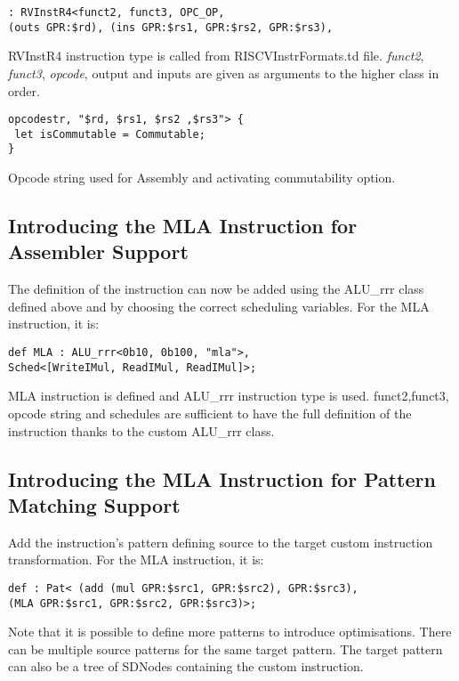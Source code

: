 \begin{lstlisting}
: RVInstR4<funct2, funct3, OPC_OP,
(outs GPR:$rd), (ins GPR:$rs1, GPR:$rs2, GPR:$rs3),
\end{lstlisting}

RVInstR4 instruction type is called from RISCVInstrFormats.td file. \textit{funct2}, \textit{funct3}, \textit{opcode}, output and inputs are given as arguments to the higher class in order.

\begin{lstlisting}
opcodestr, "$rd, $rs1, $rs2 ,$rs3"> {
 let isCommutable = Commutable;
}
\end{lstlisting}

Opcode string used for Assembly and activating commutability option.

\subsection{Introducing the MLA Instruction for Assembler Support}

The definition of the instruction can now be added using the ALU\_rrr class defined above and by choosing the correct scheduling variables. For the MLA instruction, it is:

\begin{lstlisting}
def MLA : ALU_rrr<0b10, 0b100, "mla">,
Sched<[WriteIMul, ReadIMul, ReadIMul]>;
\end{lstlisting}

MLA instruction is defined and ALU\_rrr instruction type is used. funct2,funct3, opcode string and schedules are sufficient to have the full definition of the instruction thanks to the custom ALU\_rrr class.

\subsection{Introducing the MLA Instruction for Pattern Matching Support}
Add the instruction’s pattern defining source to the target custom instruction transformation. For the MLA instruction, it is:

\begin{lstlisting}
def : Pat< (add (mul GPR:$src1, GPR:$src2), GPR:$src3),
(MLA GPR:$src1, GPR:$src2, GPR:$src3)>;
\end{lstlisting}

Note that it is possible to define more patterns to introduce optimisations. There can be multiple source patterns for the same target pattern. The target pattern can also be a tree of SDNodes containing the custom instruction.

